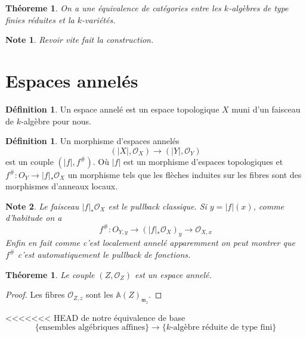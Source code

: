 \documentclass[a4paper,12pt]{book}
\newcommand{\A}{\mathbb{A}}
\newcommand{\Or}{\mathcal{O}}
\newcommand{\m}{\mathfrak{m}}
\theoremstyle{plain}
\newtheorem{thm}[subsection]{Théoreme}
\newtheorem{note}{Note}
\theoremstyle{definition}
\newtheorem{defn}[subsection]{Définition}
\theoremstyle{remark}
\begin{document}
\begin{thm}
    On a une équivalence de catégories entre les $k$-algèbres
    de type finies réduites et la $k$-variétés.
\end{thm}
\begin{note}
    Revoir vite fait la construction.
\end{note}
\section{Espaces annelés}
\begin{defn}
    Un espace annelé est un espace topologique $X$ muni d'un faisceau
    de $k$-algèbre pour nous.
\end{defn}

\begin{defn}
    Un morphisme d'espaces annelés 
    \[(|X|,\Or_X)\to (|Y|, \Or_Y)\] 
    est un couple $(|f|, f^{\#})$. Où 
    $|f|$ est un morphisme d'espaces topologiques et
    $f^{\#}\colon O_Y\to |f|_*\Or_X$
    un morphisme tels que les flèches induites sur 
    les fibres sont des morphismes d'anneaux 
    locaux.
\end{defn}
\begin{note}
    Le faisceau $|f|_*\Or_X$ est le pullback classique. Si
    $y=|f|(x)$, comme d'habitude on a 
    \[f^\#\colon O_{Y,y}\to (|f|_*\Or_X)_y\to \Or_{X,x}\]
    Enfin en fait comme c'est localement annelé apparemment on 
    peut montrer que $f^\#$ c'est automatiquement le pullback de 
    fonctions.
\end{note}
\begin{thm}
    Le couple $(Z,\Or_Z)$ est un espace annelé.
\end{thm}
\begin{proof}
    Les fibres $\Or_{Z,z}$ sont les $\A(Z)_{\m_z}$.
\end{proof}

<<<<<<< HEAD
de notre équivalence de base 
\[\{\textrm{ensembles algébriques affines}\}\to \{k\textrm{-algèbre réduite de type fini}\}\]
\end{document}
